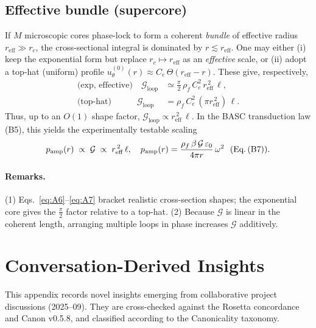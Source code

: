 \documentclass[10pt,reprint,aps,onecolumn,nofootinbib]{revtex4-2}
\begin{document}
\subsection*{Effective bundle (supercore)}
If $M$ microscopic cores phase-lock to form a coherent \emph{bundle} of effective radius $r_{\mathrm{eff}}\gg r_c$, the cross-sectional integral is dominated by $r\lesssim r_{\mathrm{eff}}$. One may either (i) keep the exponential form but replace $r_c\mapsto r_{\mathrm{eff}}$ as an \emph{effective} scale, or (ii) adopt a top-hat (uniform) profile $u_\theta^{(0)}(r)\approx C_e\,\Theta(r_{\mathrm{eff}}-r)$. These give, respectively,
\begin{align}
    \text{(exp, effective)}\quad
    \mathcal{G}_{\text{loop}}
    &\simeq \frac{\pi}{2}\,\rho_f\,C_e^2\,r_{\mathrm{eff}}^{\,2}\,\ell,
    \label{eq:A6}\\
    \text{(top-hat)}\qquad\quad
    \mathcal{G}_{\text{loop}}
    &= \rho_f\,C_e^2\,(\pi r_{\mathrm{eff}}^{\,2})\,\ell.
    \label{eq:A7}
\end{align}
Thus, up to an $O(1)$ shape factor, \emph{$\mathcal{G}_{\text{loop}}\propto r_{\mathrm{eff}}^{\,2}\,\ell$}. In the BASC transduction law (B5), this yields the experimentally testable scaling
\begin{equation}
    p_{\mathrm{amp}}(r)\;\propto\;\mathcal{G}\;\propto\;r_{\mathrm{eff}}^{\,2}\,\ell,
    \quad
    p_{\mathrm{amp}}(r)=\frac{\rho_f\,\beta\,\mathcal{G}\,\varepsilon_0}{4\pi r}\,\omega^2
    \ \ \text{(Eq.\,(B7))}.
    \label{eq:A8}
\end{equation}

\paragraph{Remarks.}
(1) Eqs.~\eqref{eq:A6}–\eqref{eq:A7} bracket realistic cross-section shapes; the exponential core gives the $\tfrac{\pi}{2}$ factor relative to a top-hat. (2) Because $\mathcal{G}$ is linear in the coherent length, arranging multiple loops in phase increases $\mathcal{G}$ additively.

\section{Conversation-Derived Insights}
\label{app:conv_insights}

This appendix records novel insights emerging from collaborative project discussions
(2025–09). They are cross-checked against the Rosetta concordance and Canon v0.5.8,
and classified according to the Canonicality taxonomy.
\end{document}
